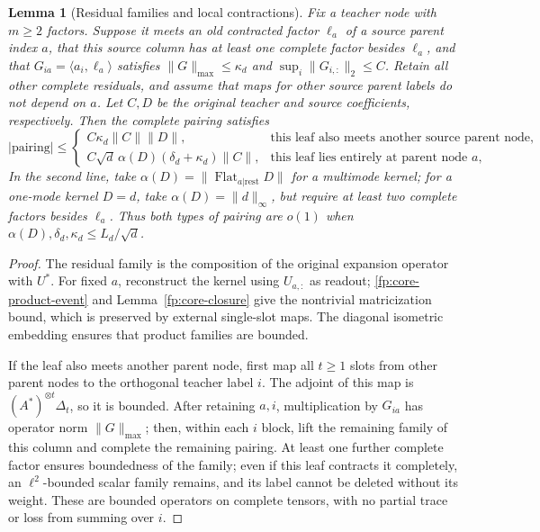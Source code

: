\documentclass[a4paper]{tufte-handout}
\newtheorem{lemma}{Lemma}
\begin{document}
\begin{fullwidth}
\begin{lemma}[Residual families and local contractions]
Fix a teacher node with $m\ge2$ factors. Suppose it meets an old contracted factor $\ell_a$ of a source parent index $a$,
that this source column has at least one complete factor besides $\ell_a$, and that $G_{ia}=\langle a_i,\ell_a\rangle$ satisfies
$\|G\|_{\max}\le\kappa_d$ and $\sup_i\|G_{i,:}\|_2\le C$.
Retain all other complete residuals, and assume that maps for other source parent labels do not depend on $a$.
Let $C,D$ be the original teacher and source coefficients, respectively. Then the complete pairing satisfies
\begin{equation}\label{fp:local-unified}
 |\mathrm{pairing}|\le
 \begin{cases}
 C\kappa_d\|C\|\|D\|,&\text{this leaf also meets another source parent node},\\
 C\sqrt d\,\alpha(D)(\delta_d+\kappa_d)\|C\|,&\text{this leaf lies entirely at parent node }a,
 \end{cases}
\end{equation}
In the second line, take $\alpha(D)=\|\operatorname{Flat}_{a|\mathrm{rest}}D\|$ for a multimode kernel;
for a one-mode kernel $D=d$, take $\alpha(D)=\|d\|_\infty$, but require at least two complete factors besides $\ell_a$.
Thus both types of pairing are $o(1)$ when $\alpha(D),\delta_d,\kappa_d\le L_d/\sqrt d$.
\end{lemma}
\begin{proof}
The residual family is the composition of the original expansion operator with $U^*$. For fixed $a$, reconstruct the kernel using $U_{a,:}$ as readout;
\eqref{fp:core-product-event} and Lemma~\ref{fp:core-closure} give the nontrivial matricization bound, which is preserved by external single-slot maps.
The diagonal isometric embedding ensures that product families are bounded.

If the leaf also meets another parent node, first map all $t\ge1$ slots from other parent nodes to the orthogonal teacher label $i$.
The adjoint of this map is $(A^*)^{\otimes t}\Delta_t$, so it is bounded.
After retaining $a,i$, multiplication by $G_{ia}$ has operator norm $\|G\|_{\max}$; then, within each $i$ block,
lift the remaining family of this column and complete the remaining pairing. At least one further complete factor ensures boundedness of the family;
even if this leaf contracts it completely, an $\ell^2$-bounded scalar family remains, and its label cannot be deleted without its weight.
These are bounded operators on complete tensors, with no partial trace or loss from summing over $i$.


\end{proof}
\end{fullwidth}
\end{document}
